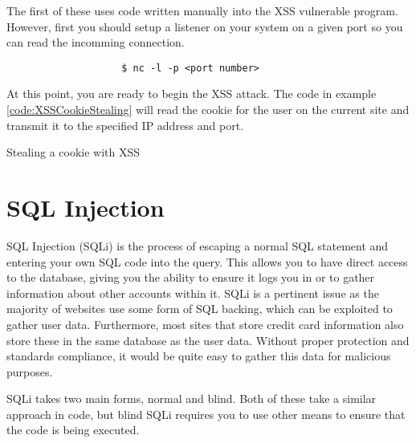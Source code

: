 				The first of these uses code written manually into the XSS vulnerable program.
				However, first you should setup a listener on your system on a given port so you can read the incomming connection.
				\begin{verbatim}
					$ nc -l -p <port number>
				\end{verbatim}

				At this point, you are ready to begin the XSS attack.
				The code in example \ref{code:XSSCookieStealing} will read the cookie for the user on the current site and transmit it to the specified IP address and port.
				\begin{code}
					\centering
					\label{code:XSSCookieStealing}
					\caption{Stealing a cookie with XSS}
				\end{code}

	\section{SQL Injection}
		SQL Injection (SQLi) is the process of escaping a normal SQL statement and entering your own SQL code into the query.
		This allows you to have direct access to the database, giving you the ability to ensure it logs you in or to gather information about other accounts within it.
		SQLi is a pertinent issue as the majority of websites use some form of SQL backing, which can be exploited to gather user data.
		Furthermore, most sites that store credit card information also store these in the same database as the user data.
		Without proper protection and standards compliance, it would be quite easy to gather this data for malicious purposes.

		SQLi takes two main forms, normal and blind.
		Both of these take a similar approach in code, but blind SQLi requires you to use other means to ensure that the code is being executed.
